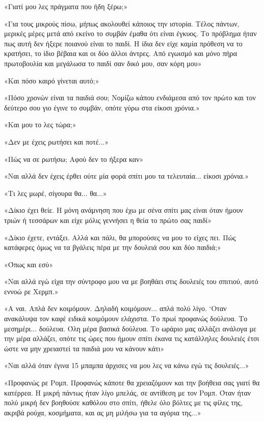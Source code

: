 \documentclass[12pt,twoside, openany]{book}
\begin{document}
«Γιατί μου λες πράγματα που ήδη ξέρω;»

«Για τους μικρούς πίσω, μήπως ακολουθεί κάποιος την ιστορία. Τέλος πάντων, μερικές μέρες μετά από εκείνο το συμβάν έμαθα ότι είναι έγκυος. Το πρόβλημα ήταν πως αυτή δεν ήξερε ποιανού είναι το παιδί. Η ίδια δεν είχε καμία πρόθεση να το κρατήσει, το ίδιο βέβαια και οι δύο άλλοι άντρες. Από εγωισμό και μόνο πήρα πρωτοβουλία και μεγάλωσα το παιδί σαν δικό μου, σαν κόρη μου»

«Και πόσο καιρό γίνεται αυτό;»

«Πόσο χρονών είναι τα παιδιά σου; Νομίζω κάπου ενδιάμεσα από τον πρώτο και τον δεύτερο σου γιο έγινε το συμβάν, οπότε γύρω στα είκοσι χρόνια.»

«Και μου το λες τώρα;»

«Δεν με έχεις ρωτήσει και ποτέ...»

«Πώς να σε ρωτήσω; Αφού δεν το ήξερα καν»

«Ναι αλλά δεν έχεις έρθει ούτε μία φορά σπίτι μου τα τελευταία... είκοσι χρόνια.»

«Τι λες μωρέ, σίγουρα θα... θα...»

«Δίκιο έχει θείε. Η μόνη ανάμνηση που έχω με σένα σπίτι μας είναι όταν ήμουν τριών ή τεσσάρων και είχε μόλις γεννήσει η θεία το πρώτο σας παιδί»

«Δίκιο έχετε, εντάξει. Αλλά και πάλι, θα μπορούσες να μου το είχες πει. Πώς κατάφερες όμως να τα βγάλεις πέρα με την δουλειά σου και δύο παιδιά;»

«Όπως και εσύ»

«Ναι αλλά εγώ είχα την σύντροφο μου να με βοηθάει στις δουλειές του σπιτιού, αυτό εννοώ ρε Χερμπ.»

«Α ναι. Απλά δεν κοιμόμουν. Δηλαδή κοιμόμουν... απλά πολύ λίγο. ‘Οταν ανακάλυψα τον καφέ ειδικά κοιμόμουν ελάχιστα. Το πρωί προφανώς δούλευα. Το μεσημέρι... δούλευα. Όλη μέρα βασικά δούλευα. Το ωράριο μας αλλάζει ανάλογα με την μέρα αλλάζει, οπότε τις ώρες που ήμουν σπίτι έκανα τις κατάλληλες δουλειές έτσι ώστε να μην χρειαστεί τα παιδιά μου να  κάνουν κάτι»

«Ναι αλλά όταν έγινα 15 μπαμπα άρχισες να μου λες να κάνω εγώ τις δουλειές...»

«Προφανώς ρε Ρομπ. Προφανώς κάποτε θα χρειαζόμουν και την βοήθεια σας γιατί θα κατέρρεα. Η μικρή πάντως ήταν λίγο μπελάς, σε αντίθεση με τον Ρομπ. Όταν ήταν πολύ μικρή δεν βοηθούσε καθόλου στο σπίτι, ήθελε όλο βόλτες με τις φίλες της, ακριβά ρούχα, κοσμήματα, και ας μη μιλήσω για τα αγόρια της...»
\end{document}
